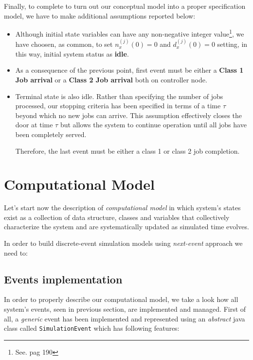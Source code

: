 \documentclass[10pt,a4paper]{article}
\begin{document}
Finally, to complete to turn out our conceptual model into a proper specification model, we have to make additional assumptions reported below:

\begin{itemize}
\item Although initial state variables can have any non-negative integer value\footnote{See. pag 190}, we have choosen, as common, to set $n_x^{(j)}(0) = 0$ and $d_x^{(j)}(0) = 0$ setting, in this way, initial system status as \textbf{idle}. 

\item As a consequence of the previous point, first event must be either a \textbf{Class 1 Job arrival} or a
\textbf{Class 2 Job arrival} both on controller node.

\item Terminal state is also idle. Rather than specifying the number of jobs processed, our stopping criteria has been specified in terms of a time $\tau$ beyond which no new jobs can arrive. This assumption effectively closes the door at time $\tau$ but allows the system to continue operation until all jobs have been completely served. 

Therefore, the last event must be either a class 1 or class 2 job completion.
\end{itemize}


\newpage
\section{Computational Model}

Let's start now the description of \textit{computational model} in which system's states exist as a collection of data structure, classes and variables that collectively characterize the system and are systematically updated as simulated time evolves.

In order to build discrete-event simulation models using \textit{next-event} approach we need to:

\subsection{Events implementation}





In order to properly describe our computational model, we take a look how all system's events, seen in previous section, are implemented and managed.
First of all, a \textit{generic} event has been implemented and represented using an \textit{abstract} java class called \texttt{SimulationEvent} which has following features:
\end{document}
